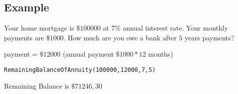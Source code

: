 \subsection{Example}
Your home mortgage is $\$100000$ at $7\%$ annual interest rate. Your monthly payments are $\$1000$. How much are you owe a bank after $5$ years payments?

payment = $\$12000$ (annual payment $\$1000 * 12$ months)

\begin{lstlisting}
RemainingBalanceOfAnnuity(100000,12000,7,5)
\end{lstlisting}

Remaining Balance is $\$71246,30$